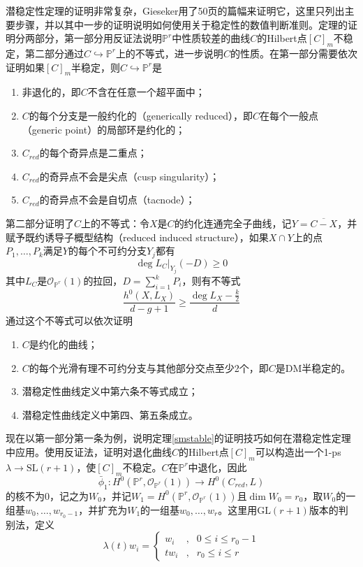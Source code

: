 潜稳定性定理的证明非常复杂，Gieseker用了50页的篇幅来证明它，这里只列出主要步骤，并以其中一步的证明说明如何使用关于稳定性的数值判断准则。定理的证明分两部分，第一部分用反证法说明$ \mathbb{P}^r $中性质较差的曲线$ C $的Hilbert点$ [C]_m $不稳定，第二部分通过$ C\hookrightarrow \mathbb{P}^r $上的不等式，进一步说明$ C $的性质。在第一部分需要依次证明如果$ [C]_m $半稳定，则$ C\hookrightarrow \mathbb{P}^r $是
\begin{enumerate}
	\item 非退化的，即$ C $不含在任意一个超平面中；
	\item $ C $的每个分支是一般约化的（generically reduced），即$ C $在每个一般点（generic point）的局部环是约化的；
	\item $ C_{red} $的每个奇异点是二重点；
	\item $ C_{red} $的奇异点不会是尖点（cusp singularity）；
	\item $ C_{red} $的奇异点不会是自切点（tacnode）；
\end{enumerate}
第二部分证明了$ C $上的不等式：令$ X $是$ C $的约化连通完全子曲线，记$ Y=\overline{C-X} $，并赋予既约诱导子概型结构（reduced induced structure），如果$ X \cap  Y $上的点$ P_1,\ldots,P_k $满足$ Y $的每个不可约分支$ Y_j $都有
$$ \deg L_C|_{Y_j}(-D)\geqslant0 $$
其中$ L_C $是$ \mathscr{O}_{\mathbb{P}^r}(1) $的拉回，$ D=\sum_{i=1}^{k}P_i $，则有不等式
$$ \frac{h^0(X,L_X)}{d-g+1}\geqslant\frac{\deg L_X -\frac{k}{2}}{d} $$
通过这个不等式可以依次证明
\begin{enumerate}
	\item $ C $是约化的曲线；
	\item $ C $的每个光滑有理不可约分支与其他部分交点至少2个，即$ C $是DM半稳定的。
	\item 潜稳定性曲线定义中第六条不等式成立；
	\item 潜稳定性曲线定义中第四、第五条成立。
\end{enumerate}
现在以第一部分第一条为例，说明定理\ref{smstable}的证明技巧如何在潜稳定性定理中应用。使用反证法，证明对退化曲线$ C $的Hilbert点$ [C]_m $可以构造出一个1-ps $ \lambda \to \mathrm{SL}(r+1) $，使$ [C]_m $不稳定。$ C $在$ \mathbb{P}^r $中退化，因此
$$ \bar{\phi}_1:H^0(\mathbb{P}^r,\mathscr{O}_{\mathbb{P}^r}(1))\to H^0(C_{red},L) $$
的核不为$ 0 $，记之为$ W_0 $，并记$ W_1=H^0(\mathbb{P}^r,\mathscr{O}_{\mathbb{P}^r}(1)) $且$ \dim W_0=r_0 $，取$ W_0 $的一组基$ w_0,\ldots,w_{r_0-1} $，并扩充为$ W_1 $的一组基$ w_0,\ldots,w_r $。这里用$ \mathrm{GL}(r+1) $版本的判别法，定义
\begin{equation*}
	\lambda (t) w_i=\left\{
	\begin{array}{rcl}
	 w_i&,&0\leqslant i \leqslant r_0-1\\
		tw_i&,&  r_0\leqslant i \leqslant r
	\end{array}\right.
\end{equation*}
